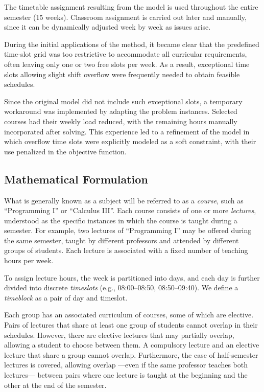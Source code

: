 The timetable assignment resulting from the model is used throughout the entire semester (15 weeks). Classroom assignment is carried out later and manually, since it can be dynamically adjusted week by week as issues arise.




During the initial applications of the method, it became clear that the predefined time‑slot grid was too restrictive to accommodate all curricular requirements, often leaving only one or two free slots per week. As a result, exceptional time slots allowing slight shift overflow were frequently needed to obtain feasible schedules.
    
Since the original model did not include such exceptional slots, a temporary workaround was implemented by adapting the problem instances. Selected courses had their weekly load reduced, with the remaining hours manually incorporated after solving. This experience led to a refinement of the model in which overflow time slots were explicitly modeled as a soft constraint, with their use penalized in the objective function.
    


\subsection{Mathematical Formulation}


What is generally known as a subject will be referred to as a \textit{course}, such as ``Programming I'' or ``Calculus III”. Each course consists of one or more \textit{lectures}, understood as the specific instances in which the course is taught during a semester. For example, two lectures of ``Programming I'' may be offered during the same semester, taught by different professors and attended by different groups of students. Each lecture is associated with a fixed number of teaching hours per week.

To assign lecture hours, the week is partitioned into days, and each day is further divided into discrete \textit{timeslots} (e.g., 08:00–08:50, 08:50–09:40). We define a \textit{timeblock} as a pair of day and timeslot.

Each group has an associated curriculum of courses, some of which are elective. Pairs of lectures that share at least one group of students cannot overlap in their schedules. However, there are elective lectures that may partially overlap, allowing a student to choose between them. A compulsory lecture and an elective lecture that share a group cannot overlap. Furthermore, the case of half-semester lectures is covered, allowing overlap ---even if the same professor teaches both lectures--- between pairs where one lecture is taught at the beginning and the other at the end of the semester.


